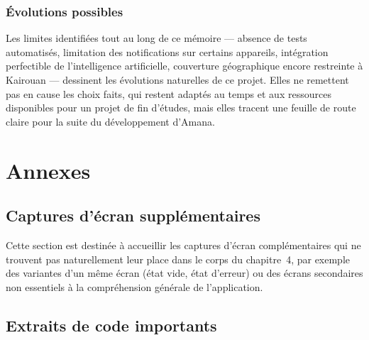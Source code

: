 \documentclass[12pt,fleqn,a4paper]{report}
\begin{document}
\begin{justify}
\subsection*{Évolutions possibles}

Les limites identifiées tout au long de ce mémoire — absence de tests automatisés, limitation des notifications sur certains appareils, intégration perfectible de l'intelligence artificielle, couverture géographique encore restreinte à Kairouan — dessinent les évolutions naturelles de ce projet. Elles ne remettent pas en cause les choix faits, qui restent adaptés au temps et aux ressources disponibles pour un projet de fin d'études, mais elles tracent une feuille de route claire pour la suite du développement d'Amana.

\clearpage
{}
{}
\printbibliography[title={Références bibliographiques},keyword=biblio]

{}
\printbibliography[title={Webographie},keyword=webo]

\chapter*{Annexes}

\section*{Captures d'écran supplémentaires}

Cette section est destinée à accueillir les captures d'écran complémentaires qui ne trouvent pas naturellement leur place dans le corps du chapitre~4, par exemple des variantes d'un même écran (état vide, état d'erreur) ou des écrans secondaires non essentiels à la compréhension générale de l'application.


\section*{Extraits de code importants}


\end{justify}
\end{document}
